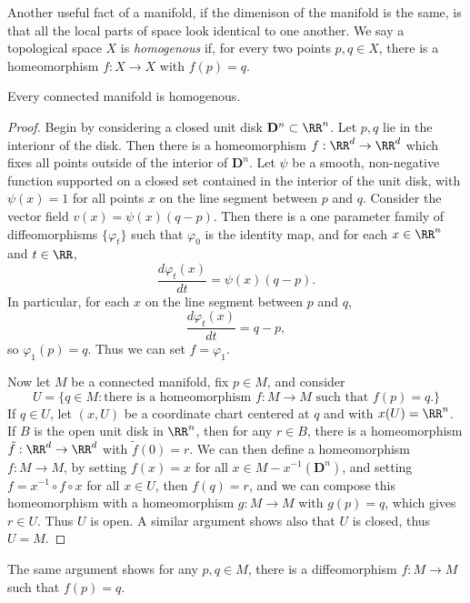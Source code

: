 Another useful fact of a manifold, if the dimenison of the manifold is the same, is that all the local parts of space look identical to one another. We say a topological space $X$ is \emph{homogenous} if, for every two points $p,q \in X$, there is a homeomorphism $f: X \to X$ with $f(p) = q$.

\begin{theorem}
    Every connected manifold is homogenous.
\end{theorem}
\begin{proof}
    Begin by considering a closed unit disk $\mathbf{D}^n \subset \RR^n$. Let $p,q$ lie in the interionr of the disk. Then there is a homeomorphism $f: \RR^d \to \RR^d$ which fixes all points outside of the interior of $\mathbf{D}^n$. Let $\psi$ be a smooth, non-negative function supported on a closed set contained in the interior of the unit disk, with $\psi(x) = 1$ for all points $x$ on the line segment between $p$ and $q$. Consider the vector field $v(x) = \psi(x) (q - p)$. Then there is a one parameter family of diffeomorphisms $\{ \varphi_t \}$ such that $\varphi_0$ is the identity map, and for each $x \in \RR^n$ and $t \in \RR$,
    \[ \frac{d\varphi_t(x)}{dt} = \psi(x) (q - p). \]
    In particular, for each $x$ on the line segment between $p$ and $q$,
    \[ \frac{d\varphi_t(x)}{dt} = q - p, \]
    so $\varphi_1(p) = q$. Thus we can set $f = \varphi_1$.

    Now let $M$ be a connected manifold, fix $p \in M$, and consider
    \[ U = \{ q \in M: \text{there is a homeomorphism $f: M \to M$ such that $f(p) = q$.} \} \]
    If $q \in U$, let $(x,U)$ be a coordinate chart centered at $q$ and with $x(U) = \RR^n$. If $B$ is the open unit disk in $\RR^n$, then for any $r \in B$, there is a homeomorphism $\tilde{f}: \RR^d \to \RR^d$ with $\tilde{f}(0) = r$. We can then define a homeomorphism $f: M \to M$, by setting $f(x) = x$ for all $x \in M - x^{-1}(\mathbf{D}^n)$, and setting $f = x^{-1} \circ f \circ x$ for all $x \in U$, then $f(q) = r$, and we can compose this homeomorphism with a homeomorphism $g: M \to M$ with $g(p) = q$, which gives $r \in U$. Thus $U$ is open. A similar argument shows also that $U$ is closed, thus $U = M$.
\end{proof}

\begin{remark}
    The same argument shows for any $p,q \in M$, there is a diffeomorphism $f: M \to M$ such that $f(p) = q$.
\end{remark}

